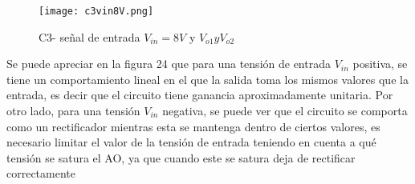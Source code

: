   \vspace{1em}

  \begin{figure}[h!]
     \centering
     \texttt{[image: c3vin8V.png]}
     \caption{C3- señal de entrada $V_{in} = 8V$ y $V_{o1} y V_{o2}$}
     \label{fig:enter-label}
 \end{figure}

\vspace{1em}

Se puede apreciar en la figura 24 que para una tensión de entrada $V_{in} $ positiva, se tiene un
comportamiento lineal en el que la salida toma los mismos valores que la entrada,
es decir que el circuito tiene ganancia aproximadamente unitaria. 
Por otro lado, para una tensión $V_{in}$ negativa, se puede ver que el circuito se comporta como un
rectificador mientras esta se mantenga dentro de ciertos valores,  es necesario limitar el valor de la tensión de entrada teniendo en cuenta a qué
tensión se satura el AO, ya que cuando este se satura deja de rectificar correctamente


%

